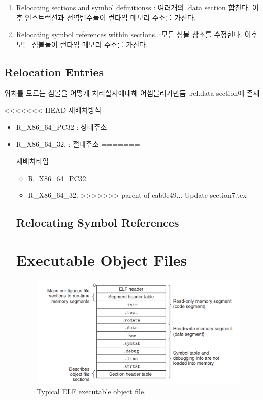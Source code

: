 \begin{enumerate}
    \item Relocating sections and symbol definitionss :  여러개의 .data section 합친다. 이후 인스트럭션과 전역변수들이 런타임 메모리 주소를 가진다.
    \item Relocating symbol references within sections. :모든 심볼 참조를 수정한다. 이후  
    모든 심볼들이 런타임 메모리 주소를 가진다.
\end{enumerate}

\subsection{Relocation Entries}
위치를 모르는 심볼을 어떻게 처리할지에대해 어셈블러가만듬
.rel.data section에 존재

<<<<<<< HEAD
재배치방식
\begin{itemize}
    \item R_X86_64_PC32 : 상대주소
    \item R_X86_64_32. : 절대주소
=======

재배치타입

\begin{itemize}
    \item R\_X86\_64\_PC32
    \item R\_X86\_64\_32.
>>>>>>> parent of cab0e49... Update section7.tex
\end{itemize}

\subsection{Relocating Symbol References}


\section{Executable Object Files}


\begin{figure}[h!]
    \centering
    \includegraphics[scale=0.4]{pic/section7/pic4.png}
    \caption{Typical ELF executable object file.}
\end{figure}


\end{itemize}
